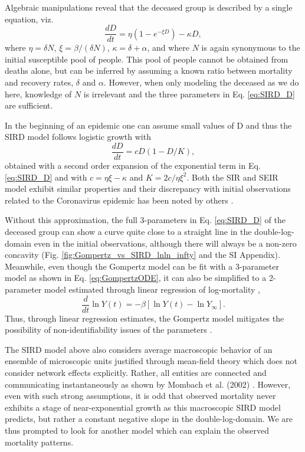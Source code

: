 \documentclass[sn-mathphys]{sn-jnl}%
\theoremstyle{thmstyleone}%
\theoremstyle{thmstyletwo}%
\theoremstyle{thmstylethree}%
\begin{document}
Algebraic manipulations reveal that the deceased group is described by a single equation, viz.
\begin{equation}
\label{eq:SIRD_D}
\frac{dD}{dt} = \eta( 1 - e^{-\xi D}) - \kappa D,
\end{equation}
where $\eta = \delta N$, $\xi = \beta/(\delta N)$, $\kappa = \delta + \alpha$, and where $N$ is again synonymous to the initial susceptible pool of people. This pool of people cannot be obtained from deaths alone, but can be inferred by assuming a known ratio between mortality and recovery rates, $\delta$ and $\alpha$. 
However, when only modeling the deceased as we do here, knowledge of $N$ is irrelevant and the three parameters in Eq. \ref{eq:SIRD_D} are sufficient.

In the beginning of an epidemic one can assume small values of D and thus the SIRD model follows logistic growth with
\begin{equation}
\frac{dD}{dt} = c D (1 - D/K),
\end{equation}
obtained with a second order expansion of the exponential term in Eq. \ref{eq:SIRD_D} and with $c=\eta\xi - \kappa$ and $K=2c/\eta\xi^2$. Both the SIR and SEIR model exhibit similar properties and their discrepancy with initial observations related to the Coronavirus epidemic has been noted by others \cite{vattay2020forecasting}.

Without this approximation, the full 3-parameters in Eq. \ref{eq:SIRD_D} of the deceased group can show a curve quite close to a straight line in the double-log-domain even in the initial observations, although there will always be a non-zero concavity (Fig. \ref{fig:Gompertz_vs_SIRD_lnln_infty} and the SI Appendix).
Meanwhile, even though the Gompertz model can be fit with a 3-parameter model as shown in Eq. \ref{eq:GompertzODE}, it can also be simplified to a 2-parameter model estimated through linear regression of log-mortality \cite{Levitt2020},
\begin{equation}
\label{eq:GompertzODE2param}
\frac{d}{dt}\ln{Y(t)} = -\beta\left[\ln{Y(t)} - \ln {Y_{\infty}}\right].
\end{equation}
Thus, through linear regression estimates, the Gompertz model mitigates the possibility of non-identifiability issues of the parameters \cite{roda2020difficult}.

The SIRD model above also considers average macroscopic behavior of an ensemble of microscopic units justified through mean-field theory \cite{smilkov2014beyond} which does not consider network effects explicitly. Rather, all entities are connected and communicating instantaneously as shown by Mombach et al. (2002) \cite{mombach2002mean}.
However, even with such strong assumptions, it is odd that observed mortality never exhibits a stage of near-exponential growth as this macroscopic SIRD model predicts, but rather a constant negative slope in the double-log-domain. We are thus prompted to look for another model which can explain the observed mortality patterns.
\end{document}
